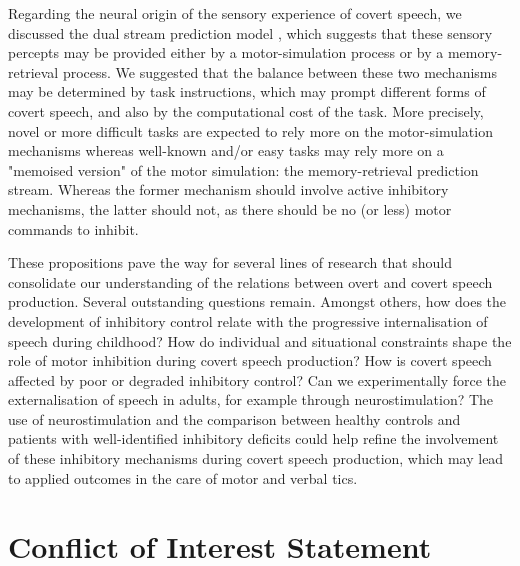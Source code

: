 \documentclass[utf8]{template/frontiersSCNS} %
\begin{document}
Regarding the neural origin of the sensory experience of covert speech, we discussed the dual stream prediction model \citep{tian_mental_2012, tian_effect_2013, tian_mental_2016}, which suggests that these sensory percepts may be provided either by a motor-simulation process or by a memory-retrieval process. We suggested that the balance between these two mechanisms may be determined by task instructions, which may prompt different forms of covert speech, and also by the computational cost of the task. More precisely, novel or more difficult tasks are expected to rely more on the motor-simulation mechanisms whereas well-known and/or easy tasks may rely more on a "memoised version" of the motor simulation: the memory-retrieval prediction stream. Whereas the former mechanism should involve active inhibitory mechanisms, the latter should not, as there should be no (or less) motor commands to inhibit.


These propositions pave the way for several lines of research that should consolidate our understanding of the relations between overt and covert speech production. Several outstanding questions remain. Amongst others, how does the development of inhibitory control relate with the progressive internalisation of speech during childhood? How do individual and situational constraints shape the role of motor inhibition during covert speech production? How is covert speech affected by poor or degraded inhibitory control? Can we experimentally force the externalisation of speech in adults, for example through neurostimulation? The use of neurostimulation and the comparison between healthy controls and patients with well-identified inhibitory deficits could help refine the involvement of these inhibitory mechanisms during covert speech production, which may lead to applied outcomes in the care of motor and verbal tics.

\section*{Conflict of Interest Statement}

\end{document}
